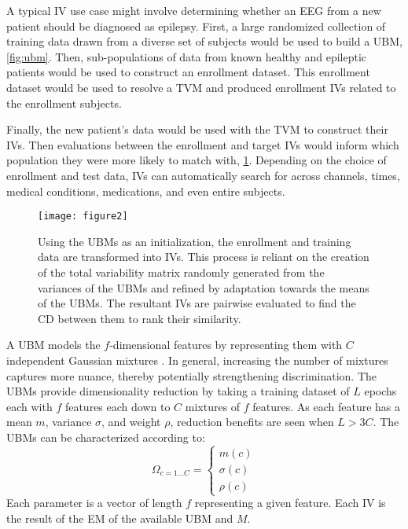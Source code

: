 A typical \ac{IV} use case might involve determining whether an \ac{EEG} from a new patient should be diagnosed as epilepsy. First, a large randomized collection of training data drawn from a diverse set of subjects would be used to build a \ac{UBM}, \cref{fig:ubm}. Then, sub-populations of data from known healthy and epileptic patients would be used to construct an enrollment dataset. This enrollment dataset would be used to resolve a \ac{TVM} and produced enrollment \acp{IV} related to the enrollment subjects.

Finally, the new patient's data would be used with the \ac{TVM} to construct their \acp{IV}. Then evaluations between the enrollment and target \acp{IV} would inform which population they were more likely to match with, \cref{fig:iVector}. Depending on the choice of enrollment and test data, \acp{IV} can automatically search for across channels, times, medical conditions, medications, and even entire subjects.

\begin{figure}[ht]
\centering
\texttt{[image: figure2]}
\caption[I-Vector Development]{Using the \acp{UBM} as an initialization, the enrollment and training data are transformed into \acp{IV}. This process is reliant on the creation of the total variability matrix randomly generated from the variances of the \acp{UBM} and refined by adaptation towards the means of the \acp{UBM}. The resultant \acp{IV} are pairwise evaluated to find the \ac{CD} between them to rank their similarity.}
\label{fig:iVector}
\end{figure}

A \ac{UBM} models the $f$-dimensional features by representing them with $C$ independent Gaussian mixtures \cite{Reynolds2000}. In general, increasing the number of mixtures captures more nuance, thereby potentially strengthening discrimination. The \acp{UBM} provide dimensionality reduction by taking a training dataset of $L$ epochs each with $f$ features each down to $C$ mixtures of $f$ features. As each feature has a mean $m$, variance $\sigma$, and weight $\rho$, reduction benefits are seen when $L > 3C$. The \acp{UBM} can be characterized according to:
\begin{equation}
\Omega_{c=1 \hdots C} =
\begin{cases}
m(c) \\
\sigma(c) \\
\rho(c)
\end{cases}
\end{equation}
Each parameter is a vector of length $f$ representing a given feature. Each \ac{IV} is the result of the \ac{EM} of the available \ac{UBM} and $M$.

